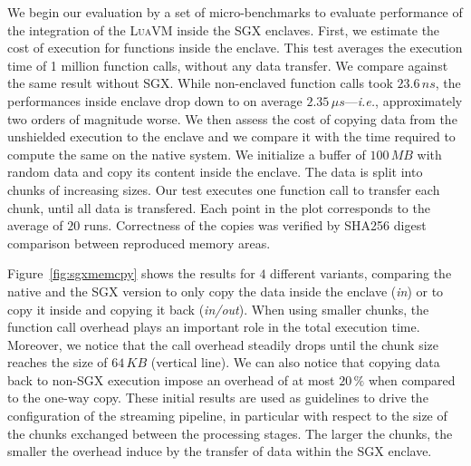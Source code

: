 We begin our evaluation by a set of micro-benchmarks to evaluate performance of the integration of the \textsc{LuaVM} inside the SGX enclaves.
First, we estimate the cost of execution for functions inside the enclave.
This test averages the execution time of 1 million function calls, without any data transfer.
We compare against the same result without SGX.
While non-enclaved function calls took $23.6\,ns$, the performances inside enclave drop down to on average $2.35\,\mu{}s$---\textit{i.e.}, approximately two orders of magnitude worse.
We then assess the cost of copying data from the unshielded execution to the enclave and we compare it with the time required to compute the same on the native system.
We initialize a buffer of $100\,MB$ with random data and copy its content inside the enclave.
The data is split into chunks of increasing sizes.
Our test executes one function call to transfer each chunk, until all data is transfered.
Each point in the plot corresponds to the average of $20$ runs.
Correctness of the copies was verified by \textsf{SHA256} digest comparison between reproduced memory areas.

Figure~\ref{fig:sgxmemcpy} shows the results for $4$ different variants, comparing the native and the SGX version to only copy the data inside the enclave (\emph{in}) or to copy it inside and copying it back (\emph{in/out}).
When using smaller chunks, the function call overhead plays an important role in the total execution time.
Moreover, we notice that the call overhead steadily drops until the chunk size reaches the size of $64\,KB$ (vertical line).
We can also notice that copying data back to non-SGX execution impose an overhead of at most $20\,\%$ when compared to the one-way copy.
These initial results are used as guidelines to drive the configuration of the streaming pipeline, in particular with respect to the size of the chunks exchanged between the processing stages. %
The larger the chunks, the smaller the overhead induce by the transfer of data within the SGX enclave.

